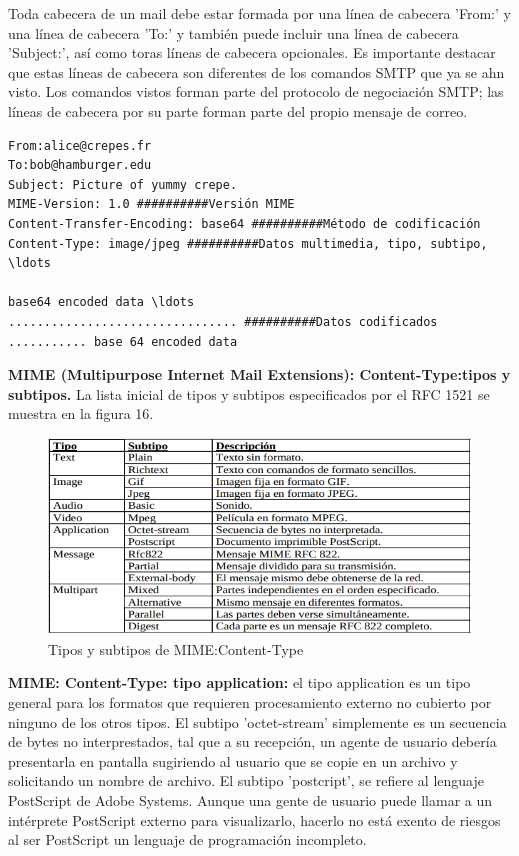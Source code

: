 \documentclass[a4paper,11pt]{article}
\begin{document}
Toda cabecera de un mail debe estar formada por una línea de cabecera 'From:' y una línea de cabecera 'To:' y también puede incluir una línea de cabecera 'Subject:', así como toras líneas de cabecera opcionales. Es importante destacar que estas líneas de cabecera son diferentes de los comandos SMTP que ya se ahn visto. Los comandos vistos forman parte del protocolo de negociación SMTP; las líneas de cabecera por su parte forman parte del propio mensaje de correo.

\begin{verbatim}
From:alice@crepes.fr
To:bob@hamburger.edu
Subject: Picture of yummy crepe.
MIME-Version: 1.0 ##########Versión MIME
Content-Transfer-Encoding: base64 ##########Método de codificación
Content-Type: image/jpeg ##########Datos multimedia, tipo, subtipo, \ldots

base64 encoded data \ldots
................................ ##########Datos codificados
........... base 64 encoded data
\end{verbatim}

\textbf{MIME (Multipurpose Internet Mail Extensions): Content-Type:tipos y subtipos.} La lista inicial de tipos y subtipos especificados por el RFC 1521 se muestra en la figura 16.

\begin{figure}[h]
\centering
\caption{Tipos y subtipos de MIME:Content-Type}
\includegraphics[scale=1,width=1.1\textwidth]{tipos_subtipos_mime.png}
\end{figure}

\textbf{MIME: Content-Type: tipo application:} el tipo application es un tipo general para los formatos que requieren procesamiento externo no cubierto por ninguno de los otros tipos. El subtipo 'octet-stream' simplemente es un secuencia de bytes no interprestados, tal que a su recepción, un agente de usuario debería presentarla en pantalla sugiriendo al usuario que se copie en un archivo y solicitando un nombre de archivo. El subtipo 'postcript', se refiere al lenguaje PostScript de Adobe Systems. Aunque una gente de usuario puede llamar a un intérprete PostScript externo para visualizarlo, hacerlo no está exento de riesgos al ser PostScript un lenguaje de programación incompleto. \\
\end{document}
